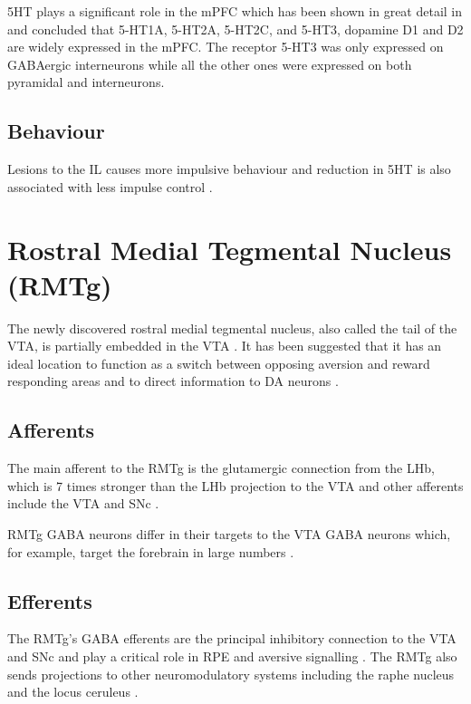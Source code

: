 \documentclass[12pt,a4paper]{article}
\let\oldsection\section
\renewcommand\section{\clearpage\oldsection}
\begin{document}
5HT plays a significant role in the mPFC which has been shown in great detail in \citep{Santana2017} and concluded that 5-HT1A, 5-HT2A, 5-HT2C, and 5-HT3, 
dopamine D1 and D2 are widely expressed in the mPFC. The receptor 5-HT3 was only expressed on GABAergic interneurons while all the other ones were expressed on both pyramidal and interneurons.


\subsection{Behaviour}
Lesions to the IL causes more impulsive behaviour \citep{Tsutsui-Kimura2016} and reduction in 5HT is also associated with less impulse control \citep{Neufang2016}.



\section{Rostral Medial Tegmental Nucleus (RMTg) }

The newly discovered rostral medial tegmental nucleus, also called the tail of
the VTA, is partially embedded in the VTA \citep{Bourdy2012}. It has been suggested that it has
an ideal location to function as a switch between opposing aversion and reward
responding areas and to direct information to DA neurons \citep{Barrot2012}.

\subsection{Afferents}

The main afferent to the RMTg is the glutamergic connection from the LHb, which is 7 times
stronger than the LHb projection to the VTA \citep{Barrot2012} and other afferents include
the VTA and SNc \citep{Lavezzi2011}.

RMTg GABA neurons differ in their targets to the VTA GABA neurons which, for example, target the forebrain in large numbers \citep{Barrot2012}. 

\subsection{Efferents}

The RMTg’s GABA efferents are the principal inhibitory connection to the VTA and SNc and play a critical role in RPE and aversive signalling \citep{Bourdy2012}. The RMTg also sends projections to other neuromodulatory systems including the raphe nucleus and the locus ceruleus \citep{Barrot2012} \citep{Hong2011}.
\end{document}
